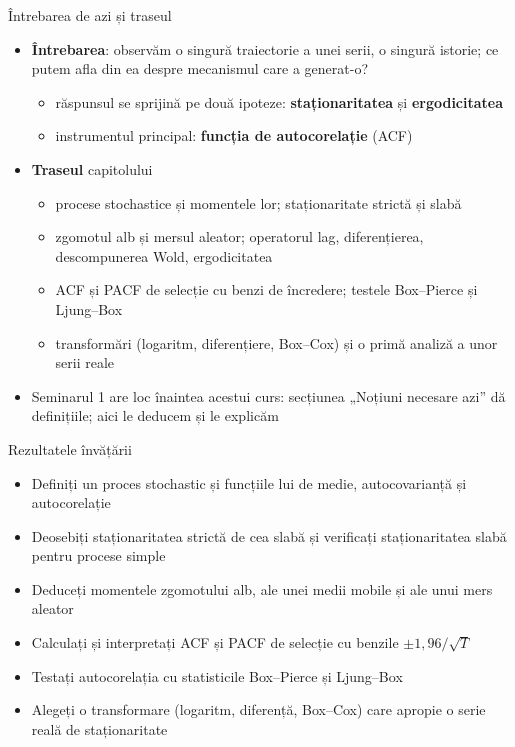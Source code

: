 \begin{frame}{Întrebarea de azi și traseul}
\itemsize{\small}
\begin{itemize}
    \item \textbf{Întrebarea}: observăm o singură traiectorie a unei serii, o singură istorie; ce putem afla din ea despre mecanismul care a generat-o?
    \begin{itemize}
        \item răspunsul se sprijină pe două ipoteze: \textbf{staționaritatea} și \textbf{ergodicitatea}
        \item instrumentul principal: \textbf{funcția de autocorelație} (ACF)
    \end{itemize}
    \item \textbf{Traseul} capitolului
    \begin{itemize}
        \item procese stochastice și momentele lor; staționaritate strictă și slabă
        \item zgomotul alb și mersul aleator; operatorul lag, diferențierea, descompunerea Wold, ergodicitatea
        \item ACF și PACF de selecție cu benzi de încredere; testele Box--Pierce și Ljung--Box
        \item transformări (logaritm, diferențiere, Box--Cox) și o primă analiză a unor serii reale
    \end{itemize}
    \item Seminarul 1 are loc înaintea acestui curs: secțiunea „Noțiuni necesare azi” dă definițiile; aici le deducem și le explicăm
\end{itemize}
\end{frame}

\begin{frame}{Rezultatele învățării}
\itemsize{\small}
\begin{itemize}
    \item Definiți un proces stochastic și funcțiile lui de medie, autocovarianță și autocorelație
    \item Deosebiți staționaritatea strictă de cea slabă și verificați staționaritatea slabă pentru procese simple
    \item Deduceți momentele zgomotului alb, ale unei medii mobile și ale unui mers aleator
    \item Calculați și interpretați ACF și PACF de selecție cu benzile $\pm 1{,}96/\sqrt{T}$
    \item Testați autocorelația cu statisticile Box--Pierce și Ljung--Box
    \item Alegeți o transformare (logaritm, diferență, Box--Cox) care apropie o serie reală de staționaritate
\end{itemize}
\end{frame}

